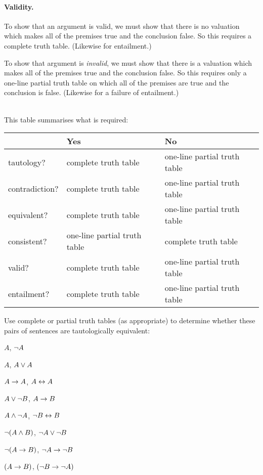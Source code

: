\paragraph{Validity.}
To show that an argument is valid, we must show that there is no valuation which makes all of the premises true and the conclusion false. So this  requires a complete truth table.  (Likewise for entailment.)

To show that argument is \emph{invalid}, we must show that there is a valuation which makes all of the premises true and the conclusion false. So this requires only a one-line partial truth table on which all of the premises are true and the conclusion is false. (Likewise for a failure of entailment.)


\
\\This table summarises what is required:

\begin{center}
\begin{tabular}{l l l}
 & \textbf{Yes} & \textbf{No}\\
 \hline
tautology? & complete truth table & one-line partial truth table\\
contradiction? &  complete truth table  & one-line partial truth table\\
equivalent? & complete truth table & one-line partial truth table\\
consistent? & one-line partial truth table & complete truth table\\
valid? & complete truth table & one-line partial truth table\\
entailment? & complete truth table & one-line partial truth table\\
\end{tabular}
\end{center}
\label{table.CompleteVsPartial}


\practiceproblems
\problempart
Use complete or partial truth tables (as appropriate) to determine whether these pairs of sentences are tautologically equivalent:
\begin{earg}
\item $A$, $\neg A$ %
\item $A$, $A \vee A$ %
\item $A\rightarrow A$, $A \leftrightarrow A$ %
\item $A \vee \neg B$, $A\rightarrow B$ %
\item $A \wedge \neg A$, $\neg B \leftrightarrow B$ %
\item $\neg(A \wedge B)$, $\neg A \vee \neg B$ %
\item $\neg(A \rightarrow B)$, $\neg A \rightarrow \neg B$ %
\item $(A \rightarrow B)$, $(\neg B \rightarrow \neg A)$ %
\end{earg}

